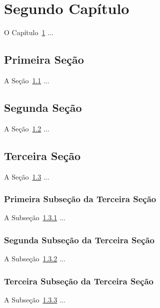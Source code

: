 \chapter{Segundo Capítulo}
\label{cap:segundo} 		%

O Capítulo~\ref{cap:segundo} ...

\section{Primeira Seção}
\label{sec:segundo_1}

A Seção~\ref{sec:segundo_1} ...

\section{Segunda Seção}
\label{sec:segundo_2}

A Seção~\ref{sec:segundo_2} ...

\section{Terceira Seção}
\label{sec:segundo_3}

A Seção~\ref{sec:segundo_3} ...

\subsection{Primeira Subseção da Terceira Seção}
\label{subsec:segundo_3.1}

A Subseção~\ref{subsec:segundo_3.1} ...

\subsection{Segunda Subseção da Terceira Seção}
\label{subsec:segundo_3.2}

A Subseção~\ref{subsec:segundo_3.2} ...

\subsection{Terceira Subseção da Terceira Seção}
\label{subsec:segundo_3.3}

A Subseção~\ref{subsec:segundo_3.3} ...
